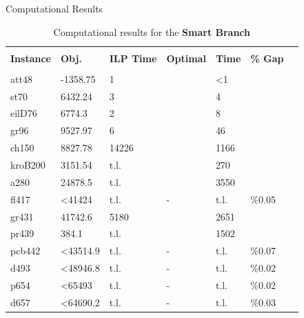 \begin{frame}[t]{Computational Results}
    \begin{table}
        \begin{center}
            \resizebox{.75\textwidth}{!}
            {
                \begin{tabular}{l l l l l l l}
                    \hline \\
                    \textbf{Instance}	&	\textbf{Obj.}	&	\textbf{ILP Time}	&	\textbf{Optimal}	&	\textbf{Time}	&	\textbf{\% Gap}	& \\
                    \hline \\
                    att48		&	-1358.75	&	1		&	\checkmark	&	<1		&			&	\\
                    st70		&	6432.24	    &	3		&	\checkmark	&	4		&			&	\\
                    eilD76		&	6774.3		&	2		&	\checkmark	&	8		&			&	\\
                    gr96		&	9527.97	    &	6		&	\checkmark	&	46		&			&	\\
                    ch150		&	8827.78	    &	14226	&	\checkmark	&	1166	&			&	\\
                    kroB200		&	3151.54	    &	t.l.	&	\checkmark	&	270		&			&	\\
                    a280		&	24878.5	    &	t.l.	&	\checkmark	&	3550	&			&	\\
                    fl417		&   <41424	    &	t.l.	&	-			&	t.l.	&	\%0.05	&	\\
                    gr431		&	41742.6	    &	5180	&	\checkmark	&	2651	&			&	\\
                    pr439		&	384.1	    &	t.l.	&	\checkmark	&	1502	&			&	\\
                    pcb442		&   <43514.9    &	t.l.	&	-			&	t.l.	&	\%0.07	&	\\
                    d493		&   <48946.8	&	t.l.	&	-			&	t.l.	&	\%0.02	&	\\
                    p654		&	<65493		&	t.l.	&	-			&	t.l.	&	\%0.02	&	\\
                    d657		&	<64690.2	&	t.l.	&	-			&	t.l.	&	\%0.03	&	\\
                    \hline
                \end{tabular} }
            \caption{Computational results for the \textbf{Smart Branch}} \label{tbl:results3}
        \end{center}
    \end{table}
\end{frame}

